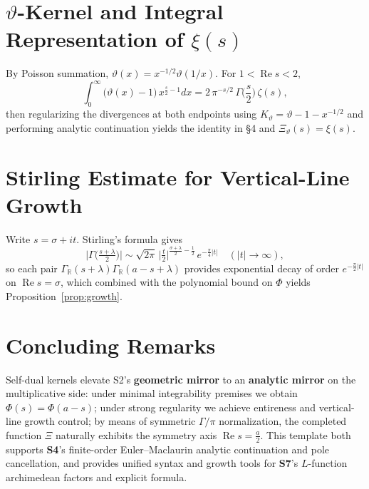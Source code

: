 \documentclass[11pt,a4paper]{article}
\theoremstyle{remark}
\DeclareMathOperator{\Re}{Re}
\begin{document}
\section{$\vartheta$-Kernel and Integral Representation of $\xi(s)$}

By Poisson summation, $\vartheta(x)=x^{-1/2}\vartheta(1/x)$. For $1<\Re s<2$,
\begin{equation}
\int_0^\infty\big(\vartheta(x)-1\big)\,x^{\frac{s}{2}-1}dx=2\,\pi^{-s/2}\,\Gamma\Big(\frac{s}{2}\Big)\,\zeta(s),
\end{equation}
then regularizing the divergences at both endpoints using $K_\vartheta=\vartheta-1-x^{-1/2}$ and performing analytic continuation yields the identity in \S4 and
$\Xi_\vartheta(s)=\xi(s)$.

\section{Stirling Estimate for Vertical-Line Growth}

Write $s=\sigma+it$. Stirling's formula gives
\begin{equation}
\big|\Gamma\big(\tfrac{s+\lambda}{2}\big)\big|\sim \sqrt{2\pi}\,\Big|\tfrac{t}{2}\Big|^{\frac{\sigma+\lambda}{2}-\frac{1}{2}}\,e^{-\frac{\pi}{4}|t|}\quad(|t|\to\infty),
\end{equation}
so each pair
$\Gamma_{\mathbb{R}}(s+\lambda)\Gamma_{\mathbb{R}}(a-s+\lambda)$
provides exponential decay of order $e^{-\frac{\pi}{2}|t|}$ on $\Re s=\sigma$, which combined with the polynomial bound on $\Phi$ yields Proposition~\ref{prop:growth}.

\section*{Concluding Remarks}

Self-dual kernels elevate S2's \textbf{geometric mirror} to an \textbf{analytic mirror} on the multiplicative side: under minimal integrability premises we obtain $\Phi(s)=\Phi(a-s)$; under strong regularity we achieve entireness and vertical-line growth control; by means of symmetric $\Gamma/\pi$ normalization, the completed function $\Xi$ naturally exhibits the symmetry axis $\Re s=\frac{a}{2}$. This template both supports \textbf{S4}'s finite-order Euler--Maclaurin analytic continuation and pole cancellation, and provides unified syntax and growth tools for \textbf{S7}'s $L$-function archimedean factors and explicit formula.
\end{document}
